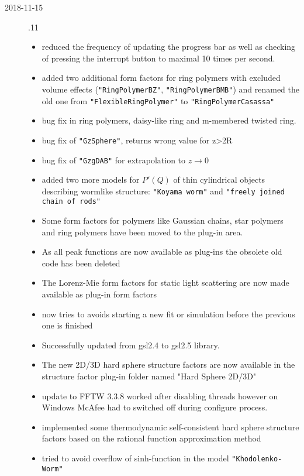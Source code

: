 \begin{description}
\item[2018-11-15] .11
    \begin{itemize}
    \item reduced the frequency of updating the progress bar as well as checking of pressing the interrupt button to maximal 10 times per second.
    \item added two additional form factors for ring polymers with excluded volume effects (\texttt{"RingPolymerBZ"}, \texttt{"RingPolymerBMB"}) and renamed the old one from \texttt{"FlexibleRingPolymer"} to \texttt{"RingPolymerCasassa"}
    \item bug fix in ring polymers, daisy-like ring and m-membered twisted ring.
    \item bug fix of \texttt{"GzSphere"}, returns wrong value for z>2R
    \item bug fix of \texttt{"GzgDAB"} for extrapolation to $z\rightarrow 0$
    \item added two more models for $P'(Q)$ of thin cylindrical objects describing wormlike structure: \texttt{"Koyama worm"} and \texttt{"freely joined chain of rods"}
    \item Some form factors for polymers like Gaussian chains, star polymers and ring polymers have been moved to the plug-in area.
    \item As all peak functions are now available as plug-ins the obsolete old code has been deleted
    \item The Lorenz-Mie form factors for static light scattering are now made available as plug-in form factors
    \item \SASfit now tries to avoids starting a new fit or simulation before the previous one is finished
    \item Successfully updated from gsl2.4 to gsl2.5 library.
    \item The new 2D/3D hard sphere structure factors are now available in the structure factor plug-in folder named "Hard Sphere 2D/3D"
    \item update to FFTW 3.3.8 worked after disabling threads however on Windows McAfee had to switched off during configure process.
    \item implemented some thermodynamic self-consistent hard sphere structure factors based on the rational function approximation method
    \item tried to avoid overflow of sinh-function in the model \texttt{"Khodolenko-Worm"}

\end{itemize}
\end{description}
